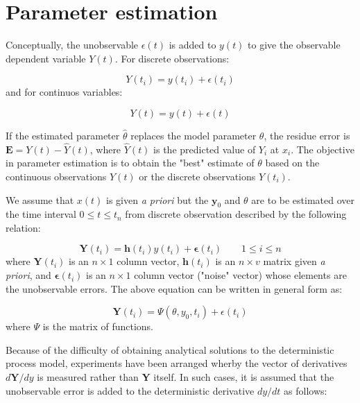 \documentclass[a4paper,fleqn]{cas-dc}
\begin{document}
\newpage
\section{Parameter estimation} \label{CH: Parameter_estimation}

Conceptually, the unobservable $\epsilon(t)$ is added to $y(t)$ to give the observable dependent variable $Y(t)$. For discrete observations:

{\footnotesize
	\begin{equation}
		Y(t_i) = y(t_i) + \epsilon(t_i)
\end{equation} }
and for continuos variables:

{\footnotesize
\begin{equation}
	Y(t) = y(t) + \epsilon(t)
\end{equation} }

If the estimated parameter $\hat{\theta}$ replaces the model parameter $\theta$, the residue error is $\textbf{E} = Y(t) - \hat{Y}(t)$, where $\hat{Y}(t)$ is the predicted value of $Y_i$ at $x_i$. The objective in parameter estimation is to obtain the "best" estimate of $\theta$ based on the continuous observations $Y(t)$ or the discrete observations $Y(t_i)$. 

We assume that $x(t)$ is given \textit{a priori} but the $\textbf{y}_0$ and $\theta$ are to be estimated over the time interval $0 \leq t \leq t_n$ from discrete observation described by the following relation:

{\footnotesize
\begin{equation}
	\textbf{Y}(t_i) = \textbf{h}(t_i)y(t_i) + \boldsymbol{\epsilon}(t_i) \qquad 1 \leq i \leq n
\end{equation} }
where $\textbf{Y}(t_i)$ is an $n \times 1$ column vector, $\textbf{h}(t_i)$ is an $n \times v$ matrix given \textit{a priori}, and $ \boldsymbol{\epsilon} (t_i)$ is an $n \times 1$ column vector ("noise" vector) whose elements are the unobservable errors. The above equation can be written in general form as:

{\footnotesize
\begin{equation} \label{EQ: Measurment_noise}
	\textbf{Y}(t_i) = \Psi(\theta, y_0, t_i) + \epsilon(t_i)
\end{equation}}
where $\Psi$ is the matrix of functions.

Because of the difficulty of obtaining analytical solutions to the deterministic process model, experiments have been arranged wherby the vector of derivatives $d\textbf{Y}/dy$ is measured rather than \textbf{Y} itself. In such cases, it is assumed that the unobservable error is added to the deterministic derivative $dy/dt$ as follows:
\end{document}
